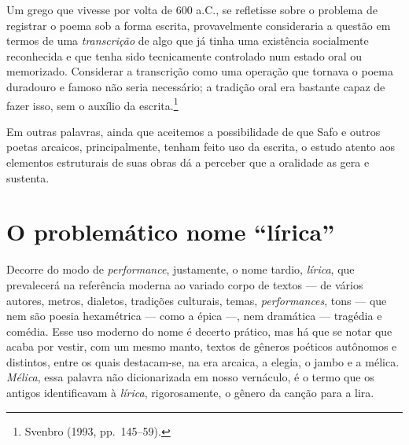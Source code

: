 \begin{hedraquote}
Um grego que vivesse por volta de 600 a.C., se refletisse sobre o problema de
registrar o poema sob a forma escrita, provavelmente consideraria a questão em
termos de uma \textit{transcrição} de algo que já tinha uma existência
socialmente reconhecida e que tenha sido tecnicamente controlado num estado
oral ou memorizado. Considerar a transcrição como uma operação que tornava o
poema duradouro e famoso não seria necessário; a tradição oral era bastante
capaz de fazer isso, sem o auxílio da escrita.\footnote{ Svenbro (1993, pp.~145--59).}
\end{hedraquote}

Em outras palavras, ainda que aceitemos a possibilidade de que Safo e outros
poetas arcaicos, principalmente, tenham feito uso da escrita, o estudo atento
aos elementos estruturais de suas obras dá a perceber que a oralidade as gera e
sustenta.

\section{O problemático nome “lírica”}

Decorre do modo de \textit{performance}, justamente, o nome tardio,
\textit{lírica}, que prevalecerá na referência moderna ao variado corpo de
textos --- de vários autores, metros, dialetos, tradições culturais, temas,
\textit{performances}, tons --- que nem são poesia hexamétrica --- como a
épica ---, nem dramática --- tragédia e comédia. Esse uso moderno do nome é decerto
prático, mas há que se notar que acaba por vestir, com um mesmo manto, textos
de gêneros poéticos autônomos e distintos, entre os quais destacam-se, na era
arcaica, a elegia, o jambo e a mélica. \textit{Mélica}, essa palavra não
dicionarizada em nosso vernáculo, é o termo que os antigos identificavam à
\textit{lírica}, rigorosamente, o gênero da canção para a lira. 

